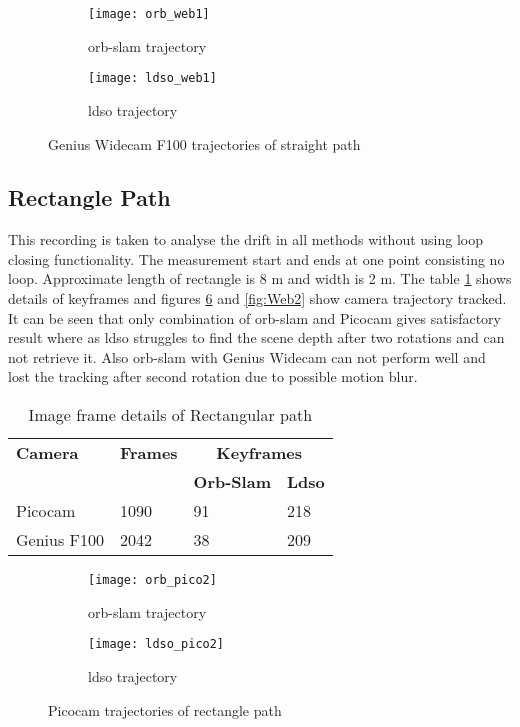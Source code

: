 \begin{figure}[H]
	\begin{subfigure}{.5\textwidth}
		\centering
		\texttt{[image: orb\_web1]}
		\caption{\acrshort{orb}-\acrshort{slam} trajectory}
		\label{fig:orb_web1}
	\end{subfigure}%
	\begin{subfigure}{.5\textwidth}
		\centering
		\texttt{[image: ldso\_web1]}
		\caption{\acrshort{ldso} trajectory}
		\label{fig:ldso_web1}
	\end{subfigure}
	\caption{Genius Widecam F100 trajectories of straight path}
	\label{fig:Web1}
\end{figure}

\subsection{Rectangle Path}
This recording is taken to analyse the drift in all methods without using loop closing functionality. The measurement start and ends at one point consisting no loop. Approximate length of rectangle is 8 m and width is 2 m. The table \ref{table:rectangle} shows details of keyframes and figures \ref{fig:Pico2} and \ref{fig:Web2} show camera trajectory tracked. It can be seen that only combination of \acrshort{orb}-\acrshort{slam} and Picocam gives satisfactory result where as \acrshort{ldso}  struggles to find the scene depth after two rotations and can not retrieve it. Also \acrshort{orb}-\acrshort{slam} with Genius Widecam can not perform well and lost the tracking after second rotation due to possible motion blur.
\begin{table}[H]
	\centering
	\renewcommand{\arraystretch}{1.5}
	\begin{tabular}{ l| l| l |l }
		\textbf{Camera} & \textbf{Frames} & \multicolumn{2}{c}{\textbf{Keyframes}}  \\    
		&      & \textbf{Orb-Slam}  & \textbf{Ldso}  \\
		\hline
		Picocam & 1090 &  91  & 218 \\ 
		\hline
		Genius F100 & 2042 &  38  & 209 \\ 
	\end{tabular}
	\caption{Image frame details of Rectangular path}
	\label{table:rectangle}
\end{table}
\begin{figure}[H]
	\begin{subfigure}{.6\textwidth}
		\centering
		\texttt{[image: orb\_pico2]}
		\caption{\acrshort{orb}-\acrshort{slam} trajectory}
		\label{fig:orb_pico2}
	\end{subfigure}
	\begin{subfigure}{.4\textwidth}
		\centering
		\texttt{[image: ldso\_pico2]}
		\caption{\acrshort{ldso} trajectory}
		\label{fig:ldso_pico2}
	\end{subfigure}
	\caption{Picocam trajectories of rectangle path}
	\label{fig:Pico2}
\end{figure}
